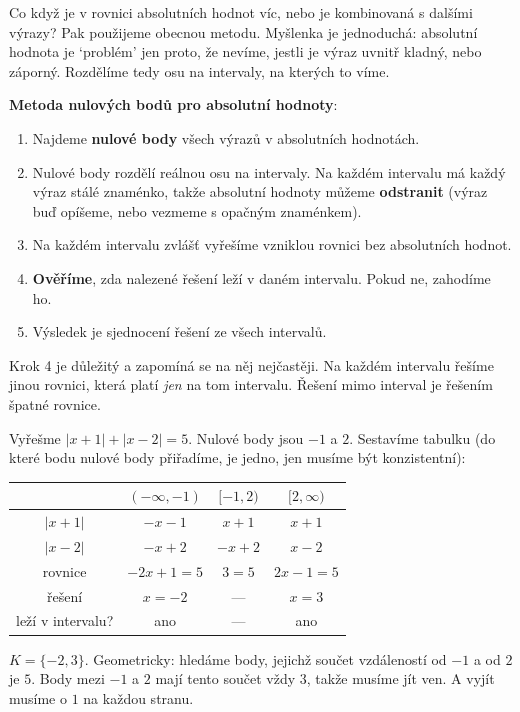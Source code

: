 Co když je v rovnici absolutních hodnot víc, nebo je kombinovaná s dalšími výrazy? Pak použijeme obecnou metodu. Myšlenka je jednoduchá: absolutní hodnota je `problém' jen proto, že nevíme, jestli je výraz uvnitř kladný, nebo záporný. Rozdělíme tedy osu na intervaly, na kterých to víme.

\begin{definitionbox}
  \textbf{Metoda nulových bodů pro absolutní hodnoty}:
  \begin{enumerate}
    \item Najdeme \textbf{nulové body} všech výrazů v absolutních hodnotách.
    \item Nulové body rozdělí reálnou osu na intervaly. Na každém intervalu má každý výraz stálé znaménko, takže absolutní hodnoty můžeme \textbf{odstranit} (výraz buď opíšeme, nebo vezmeme s opačným znaménkem).
    \item Na každém intervalu zvlášť vyřešíme vzniklou rovnici bez absolutních hodnot.
    \item \textbf{Ověříme}, zda nalezené řešení leží v daném intervalu. Pokud ne, zahodíme ho.
    \item Výsledek je sjednocení řešení ze všech intervalů.
  \end{enumerate}
\end{definitionbox}

Krok 4 je důležitý a zapomíná se na něj nejčastěji. Na každém intervalu řešíme jinou rovnici, která platí \textit{jen} na tom intervalu. Řešení mimo interval je řešením špatné rovnice.

\begin{example}\label{ex:abs-dve}
  Vyřešme $|x + 1| + |x - 2| = 5$. Nulové body jsou $-1$ a $2$. Sestavíme tabulku (do které bodu nulové body přiřadíme, je jedno, jen musíme být konzistentní):
  \begin{center}
    \renewcommand{\arraystretch}{1.4}
    \begin{tabular}{|c|c|c|c|}
      \hline
       & $(-\infty, -1)$ & $[-1, 2)$ & $[2, \infty)$ \\
      \hline
      $|x + 1|$ & $-x - 1$ & $x + 1$ & $x + 1$ \\
      $|x - 2|$ & $-x + 2$ & $-x + 2$ & $x - 2$ \\
      \hline
      rovnice & $-2x + 1 = 5$ & $3 = 5$ & $2x - 1 = 5$ \\
      řešení & $x = -2$ & --- & $x = 3$ \\
      leží v intervalu? & ano & --- & ano \\
      \hline
    \end{tabular}
  \end{center}
  $K = \{-2, 3\}$. Geometricky: hledáme body, jejichž součet vzdáleností od $-1$ a od $2$ je $5$. Body mezi $-1$ a $2$ mají tento součet vždy $3$, takže musíme jít ven. A vyjít musíme o $1$ na každou stranu.
\end{example}


